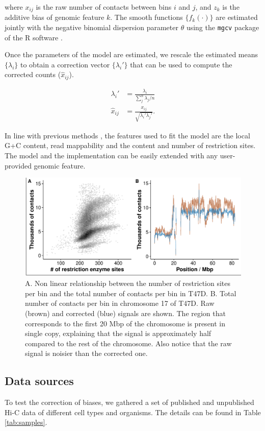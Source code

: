 \documentclass{bioinfo}
\begin{document}
\begin{methods}
\noindent
where $x_{ij}$ is the raw number of contacts between bins $i$ and $j$, and
$z_k$ is the additive bias of genomic feature $k$. The smooth functions
$\{f_k(\cdot)\}$ are estimated jointly with the negative binomial
dispersion parameter $\theta$ using the \texttt{mgcv} package
\citep{wood2011fast} of the R software \citep{coreteam2014r}.

Once the parameters of the model are estimated, we rescale the estimated
means $\{\lambda_i\}$ to obtain a correction vector $\{\lambda_i'\}$ that
can be used to compute the corrected counts ($\hat{x}_{ij}$).

\begin{align*}
\lambda_i' &= \frac{\lambda_i}{\sum_j^n{\lambda_j}/n} \\
\hat{x}_{ij} &= \frac{x_{ij}}{\sqrt{\lambda_i'\lambda_j'}}.
\end{align*}

In line with previous methods
\citep{yaffe2011probabilistic,hu2012hicnorm}, the features
used to fit the model are the local G+C content, read mappability and the 
content and number of restriction sites. The model and the implementation
can be easily extended with any user-provided genomic feature.

\begin{figure}[!tpb]
\centerline{\includegraphics[width=.45\textwidth]{img/figure1.pdf}}
\caption{A. Non linear relationship between the number of restriction
sites per bin and the total number of contacts per bin in T47D. B. Total
number of contacts per bin in chromosome 17 of T47D. Raw (brown) and
corrected (blue) signals are shown. The region that corresponds to the
first 20 Mbp of the chromosome is present in single copy, explaining that
the signal is approximately half compared to the rest of the chromosome.
Also notice that the raw signal is noisier than the corrected one.}
\label{fig:totals}
\end{figure}

\subsection{Data sources}

To test the correction of biases, we gathered a set of
published \citep{ledily2014distinct, encode2012integrated, rao20143d,
stadhouders2017transcription, lin2012global, dixon2012topological} and
unpublished Hi-C data of different cell types and organisms. The details
can be found in Table \ref{tab:samples}.


\end{methods}
\end{document}
